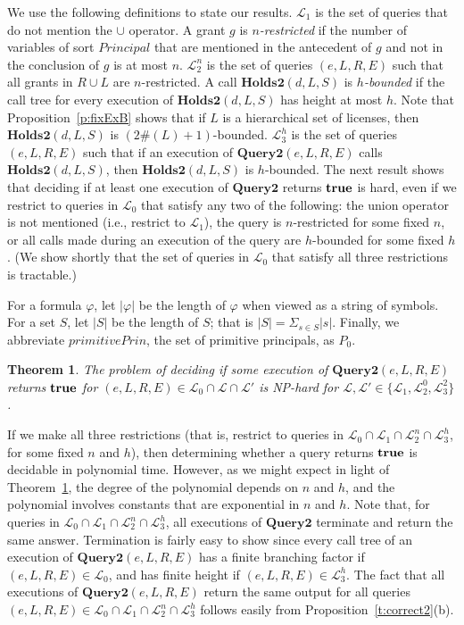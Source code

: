 \documentclass{acmtrans2m}
\newtheorem{theorem}{Theorem}[section]
\newcommand{\thm}{\begin{theorem}}
\newcommand{\ethm}{\end{theorem}}
\newcommand{\<}{
}
\renewcommand{\>}{\rangle}
\newcommand{\union}{\cup}
\newcommand{\inter}{\cap}
\renewcommand{\phi}{\varphi}
\newcommand{\cL}{\mathcal{L}}
\newcommand{\len}[1]{|#1|}
\newcommand{\card}[1]{\#({#1})}
\newcommand{\true}{\mathit{\bf{true}}}
\newcommand{\cd}{d}
\newcommand{\cc}{e}
\newcommand{\scc}{E}
\newcommand{\primitivePrinc}{\mathit{primitivePrin}}
\newcommand{\XProcTwo}{\textbf{Query2}}
\newcommand{\CMetTwo}{\textbf{Holds2}}
\newcommand{\Princ}{\mathit{Principal}}
\newcommand{\numP}{n}
\newcommand{\lenC}{h}
\begin{document}
We use the following definitions to state our results.  $\cL_1$ is the set of queries that do not
mention the $\union$ operator.  A grant $g$ is \emph{$n$-restricted} if the number of variables of sort
$\Princ$ that are mentioned in the antecedent of $g$ and not in the conclusion of $g$ is at most $\numP$.
$\cL_2^{\numP}$ is the set of queries $(\cc, L, R, \scc)$ such that all grants in $R \union L$ are
$n$-restricted.  A call $\CMetTwo(\cd, L, S)$ is \emph{$h$-bounded} if the call tree for every execution
of $\CMetTwo(\cd, L, S)$ has height at most $\lenC$.  Note that Proposition~\ref{p:fixExB} shows that
if $L$ is a hierarchical set of licenses, then $\CMetTwo(\cd, L, S)$ is $(2\card{L}+1)$-bounded.
$\cL_3^{\lenC}$ is the set of queries $(\cc, L, R, \scc)$ such that if an execution of
$\XProcTwo(\cc, L, R, \scc)$ calls $\CMetTwo(\cd, L, S)$, then $\CMetTwo(\cd, L, S)$ is $h$-bounded.
The next result shows that deciding if at least one execution of $\XProcTwo$ returns $\true$ is hard, even
if we restrict to queries in $\cL_0$ that satisfy any two of the following: the union operator is not
mentioned (i.e., restrict to $\cL_1$), the query is $n$-restricted for some fixed $n$, or all calls made
during an execution of the query are $h$-bounded for some fixed $h$.  (We show shortly that the set of
queries in $\cL_0$ that satisfy all three restrictions is tractable.)

For a formula $\phi$, let $\len{\phi}$ be the length of $\phi$ when viewed as a string of symbols.  For a
set $S$, let $\len{S}$ be the length of $S$; that is $\len{S} = \Sigma_{s\in S} |s|$.  Finally, we
abbreviate $\primitivePrinc$, the set of primitive principals, as $P_0$.

\thm\label{t:NPHardAll}
The problem of deciding
if some
execution of $\XProcTwo(\cc, L, R, \scc)$ returns $\true$ for $(\cc,L,R, \scc)\in\cL_0\cap\cL\cap\cL'$
is  NP-hard for $\cL, \cL' \in \{\cL_1, \cL_2^{0}, \cL_3^2\}$.
\ethm

If we make all three restrictions (that is, restrict to queries in
$\cL_0 \inter \cL_1 \inter \cL_2^n \inter \cL_3^h$, for some fixed $n$ and $h$), then determining whether
a query returns $\true$ is decidable in polynomial time.  However, as we might expect in light of
Theorem~\ref{t:NPHardAll}, the degree of the polynomial depends on $n$ and $h$, and the polynomial involves
constants that are exponential in $n$ and $h$.  Note that, for queries in
$\cL_0 \inter \cL_1 \inter \cL_2^n \inter \cL_3^h$, all executions of $\XProcTwo$ terminate and return the
same answer.  Termination is fairly easy to show since every call tree of an execution of
$\XProcTwo(\cc, L, R, \scc)$ has a finite branching factor if $(\cc, L, R, \scc) \in \cL_0$, and has finite
height if $(\cc, L, R, \scc)\in \cL_3^h$.  The fact that all executions of $\XProcTwo(\cc, L, R, \scc)$
return the same output for all queries
$(\cc, L, R, \scc) \in \cL_0 \inter \cL_1 \inter \cL_2^n \inter\cL_3^h$ follows easily from
Proposition~\ref{t:correct2}(b).
\end{document}
